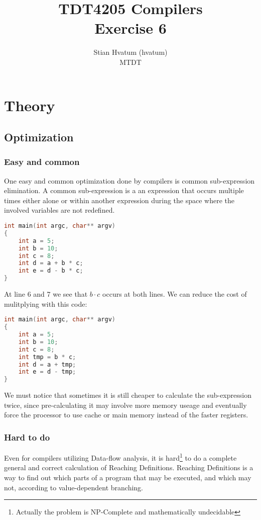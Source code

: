 \documentclass[english,a4paper]{scrartcl}
\title{TDT4205 Compilers\\
\Huge Exercise 6}
\author{Stian Hvatum (hvatum)\\MTDT}
\begin{document}
\maketitle
\tableofcontents
\newpage
\section{Theory}
\subsection{Optimization}
\subsubsection{Easy and common}
One easy and common optimization done by compilers is common sub-expression
elimination. A common sub-expression is a an expression that occurs multiple
times either alone or within another expression during the space where the
involved variables are not redefined.

\begin{lstlisting}[language=C]
int main(int argc, char** argv)
{
    int a = 5;
    int b = 10;
    int c = 8;
    int d = a + b * c;
    int e = d - b * c;
}
\end{lstlisting}

At line 6 and 7 we see that \(b \cdot c\) occurs at both lines. We can reduce
the cost of mulitplying with this code:
\begin{lstlisting}[language=C]
int main(int argc, char** argv)
{
    int a = 5;
    int b = 10;
    int c = 8;
    int tmp = b * c;
    int d = a + tmp;
    int e = d - tmp;
}
\end{lstlisting}

We must notice that sometimes it is still cheaper to calculate the
sub-expression twice, since pre-calculating it may involve more memory useage
and eventually force the processor to use cache or main memory instead of
the faster registers.

\subsubsection{Hard to do}
Even for compilers utilizing Data-flow analysis, it is hard\footnote{Actually
the problem is NP-Complete and mathematically undecidable} to do a complete
general and correct calculation of Reaching Definitions.
Reaching Definitions is a way to find out which parts of a program that may be executed,
and which may not, according to value-dependent branching.
\end{document}
